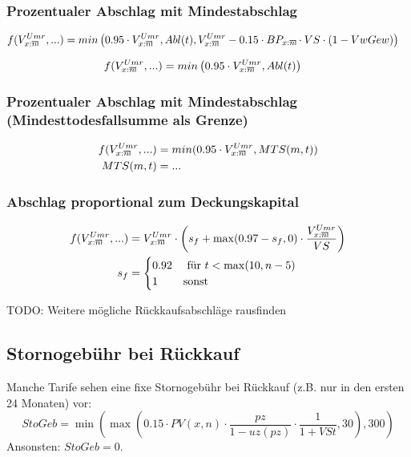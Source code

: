 \documentclass[a4paper,10pt]{article}
\makeatletter
\newcommand{\xn}{{\act[x]{n}}}
\DeclareRobustCommand{\act}[2][]{%
\def\arraystretch{0}%
\setlength\arraycolsep{0.5pt}%
\setlength\arrayrulewidth{0.5pt}%
\setbox0=\hbox{$\scriptstyle#1\ifx#1\empty{asdf}\else:\fi#2$}%
\begin{array}[b]{*2{@{}>{\scriptstyle}c}|}
\cline{2-2}%
\rule[1.25pt]{0pt}{\ht0}%
#1\ifx#1\empty\else:\fi & #2%
\end{array}%
}
\makeatother
\begin{document}
\subsubsection*{Prozentualer Abschlag mit Mindestabschlag}
\begin{align*}
f(V_\xn^{Umr}, ...) &= min\left(0.95 \cdot V_\xn^{Umr}, Abl(t), V_\xn^{Umr}-0.15 \cdot BP_\xn \cdot VS\cdot (1-VwGew)\right)
\end{align*}

\begin{align*}
f(V_\xn^{Umr}, ...) &= min\left(0.95 \cdot V_\xn^{Umr}, Abl(t)\right)
\end{align*}


\subsubsection*{Prozentualer Abschlag mit Mindestabschlag (Mindesttodesfallsumme als Grenze)}
\begin{align*}
f(V_\xn^{Umr}, ...) &= min(0.95 \cdot V_\xn^{Umr}, MTS(m,t)) \\
MTS(m,t) &= ...
\end{align*}


\subsubsection*{Abschlag proportional zum Deckungskapital}
\begin{align*}
f(V_\xn^{Umr}, ...) &= V_\xn^{Umr}\cdot \left(s_f + \max(0.97-s_f, 0) \cdot \frac{V_\xn^{Umr}}{VS}\right) \\
s_f &=\begin{cases}0.92 & \text{ für $t<\max(10, n-5)$}\\ 1 & \text{sonst}\end{cases}
\end{align*}


TODO: Weitere mögliche Rückkaufsabschläge rausfinden

\subsection{Stornogebühr bei Rückkauf}

Manche Tarife sehen eine fixe Stornogebühr bei Rückkauf (z.B. nur in den ersten 24 Monaten) vor:
\begin{equation*}
 StoGeb = \min\left(\max\left(0.15 \cdot PV(x,n) \cdot\frac{pz}{1-uz(pz)} \cdot\frac1{1+VSt}, 30 \right), 300\right)
\end{equation*}
Ansonsten: $StoGeb=0$.
\end{document}
